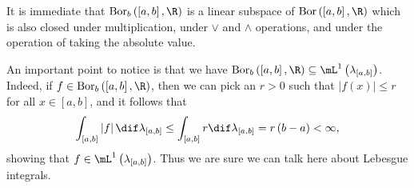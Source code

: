 \documentclass[pmath450]{subfiles}
\begin{document}
    \np It is immediate that $\bor_b\left( \left[ a,b \right],\R \right)$ is a linear subspace of $\bor\left( \left[ a,b \right],\R \right)$ which is also closed under multiplication, under $\vee$ and $\wedge$ operations, and under the operation of taking the absolute value.

    An important point to notice is that we have $\bor_b\left( \left[ a,b \right],\R \right)\subseteq\lone\left( \lambda_{\left[ a,b \right]} \right)$. Indeed, if $f\in\bor_b\left( \left[ a,b \right],\R \right)$, then we can pick an $r>0$ such that $\left| f\left( x \right) \right|\leq r$ for all $x\in\left[ a,b \right]$, and it follows that
    \begin{equation*}
        \int_{\left[ a,b \right]}\left| f \right|\dif\lambda_{\left[ a,b \right]}\leq \int_{\left[ a,b \right]}r\dif\lambda_{\left[ a,b \right]} = r\left( b-a \right)<\infty,
    \end{equation*}
    showing that $f\in\lone\left( \lambda_{\left[ a,b \right]} \right)$. Thus we are sure we can talk here about Lebesgue integrals.
\end{document}
